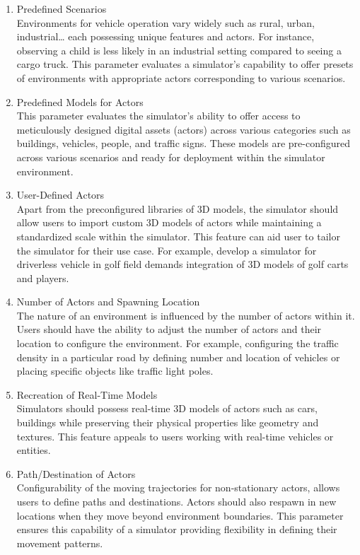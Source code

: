 \documentclass[12pt,twoside,a4paper,parskip]{scrbook} %
\begin{document}
\begin{enumerate}[label=\alph*.]
    \item Predefined Scenarios\\
    Environments for vehicle operation vary widely such as rural, urban, industrial… each possessing unique features and actors. For instance, observing a child is less likely in an industrial setting compared to seeing a cargo truck. This parameter evaluates a simulator's capability to offer presets of environments with appropriate actors corresponding to various scenarios.
    
    \item Predefined Models for Actors\\
    This parameter evaluates the simulator's ability to offer access to meticulously designed digital assets (actors) across various categories such as buildings, vehicles, people, and traffic signs. These models are pre-configured across various scenarios and ready for deployment within the simulator environment.
    
    \item User-Defined Actors\\
    Apart from the preconfigured libraries of 3D models, the simulator should allow users to import custom 3D models of actors while maintaining a standardized scale within the simulator. This feature can aid user to tailor the simulator for their use case. For example, develop a simulator for driverless vehicle in golf field demands integration of 3D models of golf carts and players.
    
    \item Number of Actors and Spawning Location\\
    The nature of an environment is influenced by the number of actors within it. Users should have the ability to adjust the number of actors and their location to configure the environment. For example, configuring the traffic density in a particular road by defining number and location of vehicles or placing specific objects like traffic light poles.
    
    \item Recreation of Real-Time Models\\
    Simulators should possess real-time 3D models of actors such as cars, buildings while preserving their physical properties like geometry and textures. This feature appeals to users working with real-time vehicles or entities.
    
    \item Path/Destination of Actors\\
    Configurability of the moving trajectories for non-stationary actors, allows users to define paths and destinations. Actors should also respawn in new locations when they move beyond environment boundaries. This parameter ensures this capability of a simulator providing flexibility in defining their movement patterns.
    

\end{enumerate}
\end{document}
